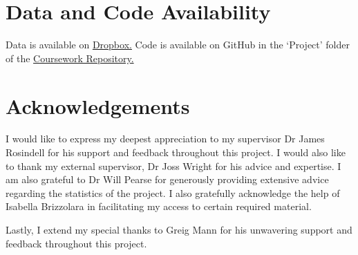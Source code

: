 \documentclass[11pt, a4paper, titlepage]{article}
\begin{document}
  
    
    \clearpage
    \section*{Data and Code Availability}
    Data is available on \href{https://www.dropbox.com/sh/pnoxzydwgmj4eaf/AABYpBAkeQJsY3yqGH8G8J86a?dl=0}{Dropbox.} 
    Code is available on GitHub in the `Project' folder of the \href{https://github.com/kayleigh-greenwood/CMEECoursework.git}{Coursework Repository.}
    
    \clearpage
    \section*{Acknowledgements}
    I would like to express my deepest appreciation to my supervisor Dr James Rosindell for his support and feedback throughout this project. I would also like to thank my external supervisor, Dr Joss Wright for his advice and expertise. I am also grateful to Dr Will Pearse for generously providing extensive advice regarding the statistics of the project. I also gratefully acknowledge the help of Isabella Brizzolara in facilitating my access to certain required material.
    
    Lastly, I extend my special thanks to Greig Mann for his unwavering support and feedback throughout this project.
    
    \newpage
    
    
\end{document}
